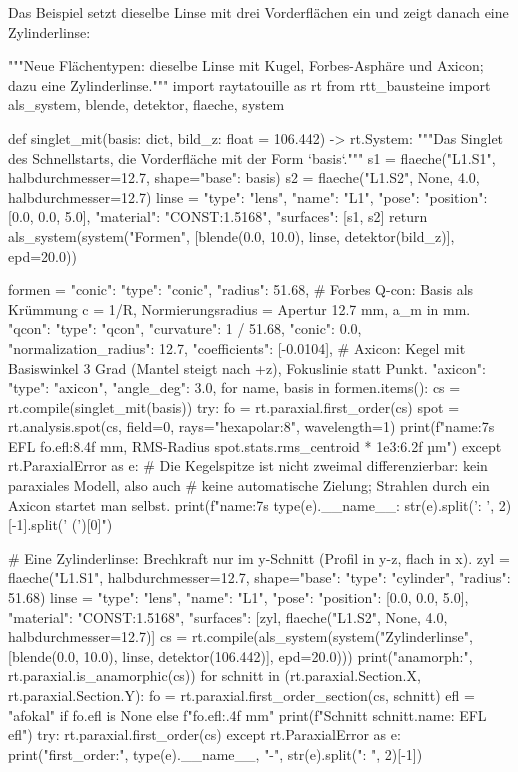\documentclass[11pt,a4paper,openany]{book}
\DeclareRobustCommand{\code}[1]{\texttt{\directlua{rttcode("\luaescapestring{\detokenize{#1}}")}}}
\begin{document}
Das Beispiel setzt dieselbe Linse mit drei Vorderflächen ein und zeigt danach eine
Zylinderlinse:
\begin{pycode}[title={\code{ex20_flaechen.py}}]
"""Neue Flächentypen: dieselbe Linse mit Kugel, Forbes-Asphäre und Axicon; dazu eine Zylinderlinse."""
import raytatouille as rt
from rtt_bausteine import als_system, blende, detektor, flaeche, system


def singlet_mit(basis: dict, bild_z: float = 106.442) -> rt.System:
    """Das Singlet des Schnellstarts, die Vorderfläche mit der Form `basis`."""
    s1 = flaeche("L1.S1", halbdurchmesser=12.7, shape={"base": basis})
    s2 = flaeche("L1.S2", None, 4.0, halbdurchmesser=12.7)
    linse = {"type": "lens", "name": "L1", "pose": {"position": [0.0, 0.0, 5.0]},
             "material": "CONST:1.5168", "surfaces": [s1, s2]}
    return als_system(system("Formen", [blende(0.0, 10.0), linse, detektor(bild_z)], epd=20.0))


formen = {
    "conic": {"type": "conic", "radius": 51.68},
    # Forbes Q-con: Basis als Krümmung c = 1/R, Normierungsradius = Apertur 12.7 mm, a_m in mm.
    "qcon": {"type": "qcon", "curvature": 1 / 51.68, "conic": 0.0,
             "normalization_radius": 12.7, "coefficients": [-0.0104]},
    # Axicon: Kegel mit Basiswinkel 3 Grad (Mantel steigt nach +z), Fokuslinie statt Punkt.
    "axicon": {"type": "axicon", "angle_deg": 3.0},
}
for name, basis in formen.items():
    cs = rt.compile(singlet_mit(basis))
    try:
        fo = rt.paraxial.first_order(cs)
        spot = rt.analysis.spot(cs, field=0, rays="hexapolar:8", wavelength=1)
        print(f"{name:7s} EFL {fo.efl:8.4f} mm, RMS-Radius {spot.stats.rms_centroid * 1e3:6.2f} µm")
    except rt.ParaxialError as e:
        # Die Kegelspitze ist nicht zweimal differenzierbar: kein paraxiales Modell, also auch
        # keine automatische Zielung; Strahlen durch ein Axicon startet man selbst.
        print(f"{name:7s} {type(e).__name__}: {str(e).split(': ', 2)[-1].split(' (')[0]}")

# Eine Zylinderlinse: Brechkraft nur im y-Schnitt (Profil in y-z, flach in x).
zyl = flaeche("L1.S1", halbdurchmesser=12.7, shape={"base": {"type": "cylinder", "radius": 51.68}})
linse = {"type": "lens", "name": "L1", "pose": {"position": [0.0, 0.0, 5.0]},
         "material": "CONST:1.5168", "surfaces": [zyl, flaeche("L1.S2", None, 4.0, halbdurchmesser=12.7)]}
cs = rt.compile(als_system(system("Zylinderlinse", [blende(0.0, 10.0), linse, detektor(106.442)],
                                  epd=20.0)))
print("anamorph:", rt.paraxial.is_anamorphic(cs))
for schnitt in (rt.paraxial.Section.X, rt.paraxial.Section.Y):
    fo = rt.paraxial.first_order_section(cs, schnitt)
    efl = "afokal" if fo.efl is None else f"{fo.efl:.4f} mm"
    print(f"Schnitt {schnitt.name}: EFL {efl}")
try:
    rt.paraxial.first_order(cs)
except rt.ParaxialError as e:
    print("first_order:", type(e).__name__, "-", str(e).split(": ", 2)[-1])
\end{pycode}
\end{document}
